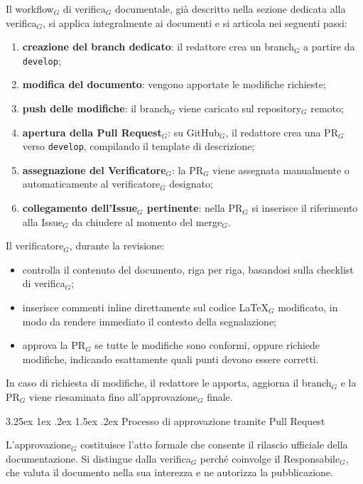 \documentclass[a4paper, 10pt]{article}
\makeatletter
\renewcommand\paragraph{\@startsection{paragraph}{4}{\z@}%
  {3.25ex \@plus1ex \@minus .2ex}%
  {1.5ex \@plus .2ex}%
  {\normalfont\normalsize\bfseries}}
\makeatother
\begin{document}
Il workflow$_G$ di verifica$_G$ documentale, già descritto nella sezione dedicata alla verifica$_G$, si applica integralmente ai documenti e si articola nei seguenti passi:
\begin{enumerate}
    \item \textbf{creazione del branch dedicato}: il redattore crea un branch$_G$ a partire da \texttt{develop};
    \item \textbf{modifica del documento}: vengono apportate le modifiche richieste;
    \item \textbf{push delle modifiche}: il branch$_G$ viene caricato sul repository$_G$ remoto;
    \item \textbf{apertura della Pull Request$_G$}: su GitHub$_G$, il redattore crea una PR$_G$ verso \texttt{develop}, compilando il template di descrizione;
    \item \textbf{assegnazione del Verificatore$_G$}: la PR$_G$ viene assegnata manualmente o automaticamente al verificatore$_G$ designato;
    \item \textbf{collegamento dell'Issue$_G$ pertinente}: nella PR$_G$ si inserisce il riferimento alla Issue$_G$ da chiudere al momento del merge$_G$.
\end{enumerate}

Il verificatore$_G$, durante la revisione:
\begin{itemize}
    \item controlla il contenuto del documento, riga per riga, basandosi sulla checklist di verifica$_G$;
    \item inserisce commenti inline direttamente sul codice \LaTeX$_G$ modificato, in modo da rendere immediato il contesto della segnalazione;
    \item approva la PR$_G$ se tutte le modifiche sono conformi, oppure richiede modifiche, indicando esattamente quali punti devono essere corretti.
\end{itemize}
In caso di richiesta di modifiche, il redattore le apporta, aggiorna il branch$_G$ e la PR$_G$ viene riesaminata fino all'approvazione$_G$ finale.

\paragraph{Processo di approvazione tramite Pull Request}

L'approvazione$_G$ costituisce l'atto formale che consente il rilascio ufficiale della documentazione. Si distingue dalla verifica$_G$ perché coinvolge il Responsabile$_G$, che valuta il documento nella sua interezza e ne autorizza la pubblicazione.
\end{document}
